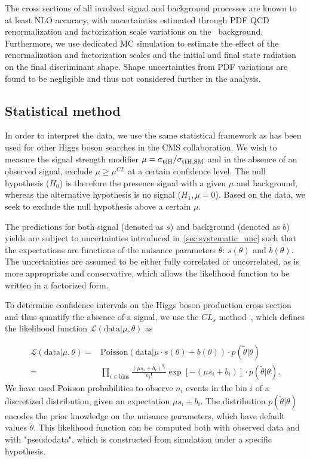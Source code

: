 The cross sections of all involved signal and background processes are known to at least NLO accuracy, with uncertainties estimated through PDF QCD renormalization and factorization scale variations on the \ttbar~background. Furthermore, we use dedicated MC simulation to estimate the effect of the renormalization and factorization scales and the initial and final state radiation on the final discriminant shape. Shape uncertainties from PDF variations are found to be negligible and thus not considered further in the analysis.

\subsection{Statistical method}
\label{sec:statistical_method}
In order to interpret the data, we use the same statistical framework as has been used for other Higgs boson searches in the CMS collaboration\cite{Chatrchyan:2012xdj,Chatrchyan:2012tx,ATLAS:2011tau}. We wish to measure the signal strength modifier $\mu = \sigma_{\mathrm{t} \bar{\mathrm{t}} \mathrm{H}}/\sigma_{\mathrm{t} \bar{\mathrm{t}} \mathrm{H},\mathrm{SM}}$ and in the absence of an observed signal, exclude $\mu \ge \mu^{CL}$ at a certain confidence level. The null hypothesis ($H_0$) is therefore the presence signal with a given $\mu$ and background, whereas the alternative hypothesis is no signal ($H_1, \mu = 0 $). Based on the data, we seek to exclude the null hypothesis above a certain $\mu$.

The predictions for both signal (denoted as $s$) and background (denoted as $b$) yields are subject to uncertainties introduced in~\cref{sec:systematic_unc} such that the expectations are functions of the nuisance parameters $\theta$: $s(\theta)$ and $b(\theta)$. The uncertainties are assumed to be either fully correlated or uncorrelated, as is more appropriate and conservative, which allows the likelihood function to be written in a factorized form.

To determine confidence intervals on the Higgs boson production cross section and thus quantify the absence of a signal, we use the $CL_s$ method~\cite{Junk:1999kv,Read:2002}, which defines the likelihood function $\mathcal{L}(\mathrm{data} | \mu, \theta)$ as

\begin{align}
\label{eq:likelihood}
\mathcal{L}(\mathrm{data} | \mu, \theta) =&  \mathrm{Poisson}(\mathrm{data} | \mu \cdot s(\theta) + b(\theta)) \cdot p(\tilde{\theta} | \theta)\\
=& \prod_{i\in \mathrm{bins}} \frac{(\mu s_i + b_i)^{n_i}}{n_i!} \exp{[-(\mu s_i + b_i)]} \cdot p(\tilde{\theta} | \theta).
\end{align}
We have used Poisson probabilities to observe $n_i$ events in the bin $i$ of a discretized distribution, given an expectation $\mu s_i + b_i$. The distribution $p(\tilde{\theta} | \theta)$ encodes the prior knowledge on the nuisance parameters, which have default values $\tilde{\theta}$. This likelihood function can be computed both with observed data and with "pseudodata", which is constructed from simulation under a specific hypothesis.


